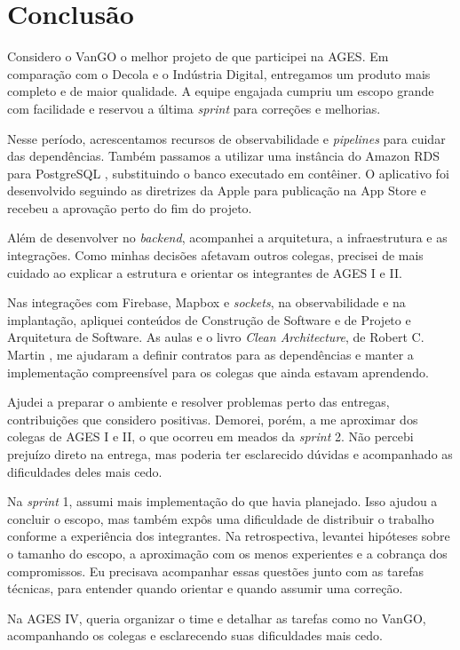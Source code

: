 \section[Conclusão]{Conclusão}

Considero o VanGO o melhor projeto de que participei na AGES. Em comparação
com o Decola e o Indústria Digital, entregamos um produto mais completo e de
maior qualidade. A equipe engajada cumpriu um escopo grande com facilidade e
reservou a última \textit{sprint} para correções e melhorias.

Nesse período, acrescentamos recursos de observabilidade e
\textit{pipelines} para cuidar das dependências. Também passamos a utilizar
uma instância do Amazon RDS para PostgreSQL \cite{aws-rds-postgresql},
substituindo o banco executado em contêiner. O aplicativo foi desenvolvido
seguindo as diretrizes da Apple para publicação na App Store
\cite{apple-app-review-guidelines} e recebeu a aprovação perto do fim do
projeto.

Além de desenvolver no \textit{backend}, acompanhei a arquitetura, a
infraestrutura e as integrações. Como minhas decisões afetavam outros colegas,
precisei de mais cuidado ao explicar a estrutura e orientar os integrantes
de AGES I e II.

Nas integrações com Firebase, Mapbox e \textit{sockets}, na observabilidade e
na implantação, apliquei conteúdos de Construção de Software e de Projeto e
Arquitetura de Software. As aulas e o livro \textit{Clean Architecture}, de
Robert C. Martin \cite{martin-clean-architecture}, me ajudaram a definir
contratos para as dependências e manter a implementação compreensível para
os colegas que ainda estavam aprendendo.

Ajudei a preparar o ambiente e resolver problemas perto das entregas,
contribuições que considero positivas. Demorei, porém, a me aproximar dos
colegas de AGES I e II, o que ocorreu em meados da \textit{sprint} 2. Não
percebi prejuízo direto na entrega, mas poderia ter esclarecido dúvidas e
acompanhado as dificuldades deles mais cedo.

Na \textit{sprint} 1, assumi mais implementação do que havia planejado.
Isso ajudou a concluir o escopo, mas também expôs uma dificuldade de distribuir
o trabalho conforme a experiência dos integrantes. Na retrospectiva,
levantei hipóteses sobre o tamanho do escopo, a aproximação com os menos
experientes e a cobrança dos compromissos. Eu precisava acompanhar essas
questões junto com as tarefas técnicas, para entender quando orientar e
quando assumir uma correção.

Na AGES IV, queria organizar o time e detalhar as tarefas como no VanGO,
acompanhando os colegas e esclarecendo suas dificuldades mais cedo.
